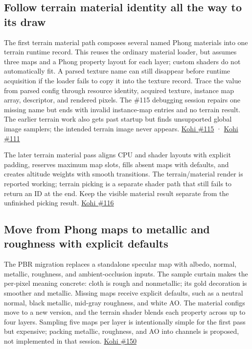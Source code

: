 \subsection{Follow terrain material identity all the way to its draw}\label{06-engine-ii-ch025-follow-terrain-material-identity-all-the-way-to-its-draw}

The first terrain material path composes several named Phong materials into one terrain runtime record. This reuses the ordinary material loader, but assumes three maps and a Phong property layout for each layer; custom shaders do not automatically fit. A parsed texture name can still disappear before runtime acquisition if the loader fails to copy it into the texture record. Trace the value from parsed config through resource identity, acquired texture, instance map array, descriptor, and rendered pixels. The \#115 debugging session repairs one missing name but ends with invalid instance-map entries and no terrain result. The earlier terrain work also gets past startup but finds unsupported global image samplers; the intended terrain image never appears. \href{https://www.youtube.com/watch?v=IaFdiRqQ-jw}{Kohi \#115} · \href{https://www.youtube.com/watch?v=J7qBRwaPxv8}{Kohi \#111}

The later terrain material pass aligns CPU and shader layouts with explicit padding, reserves maximum map slots, fills absent maps with defaults, and creates altitude weights with smooth transitions. The terrain/material render is reported working; terrain picking is a separate shader path that still fails to return an ID at the end. Keep the visible material result separate from the unfinished picking result. \href{https://www.youtube.com/watch?v=b_L8RSQlu48}{Kohi \#116}

\subsection{Move from Phong maps to metallic and roughness with explicit defaults}\label{06-engine-ii-ch025-move-from-phong-maps-to-metallic-and-roughness-with-explicit-defaults}

The PBR migration replaces a standalone specular map with albedo, normal, metallic, roughness, and ambient-occlusion inputs. The sample curtain makes the per-pixel meaning concrete: cloth is rough and nonmetallic; its gold decoration is smoother and metallic. Missing maps receive explicit defaults, such as a neutral normal, black metallic, mid-gray roughness, and white AO. The material configs move to a new version, and the terrain shader blends each property across up to four layers. Sampling five maps per layer is intentionally simple for the first pass but expensive; packing metallic, roughness, and AO into channels is proposed, not implemented in that session. \href{https://www.youtube.com/watch?v=SNdjjeRAFc4}{Kohi \#150}

